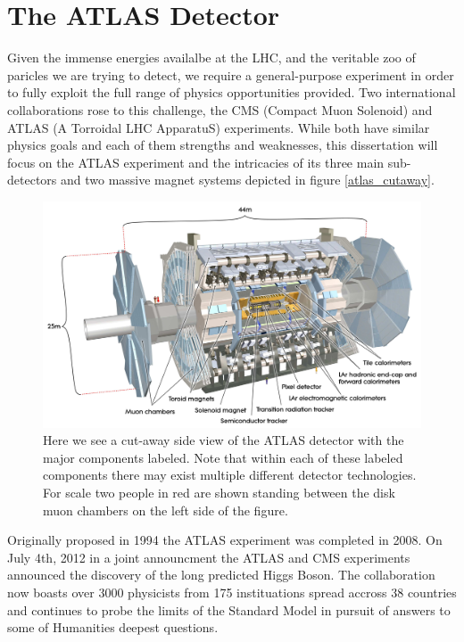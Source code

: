 \chapter{The ATLAS Detector} \label{chap:atlas}

Given the immense energies availalbe at the LHC, and the veritable zoo of
paricles we are trying to detect, we require a general-purpose experiment in
order to fully exploit the full range of physics opportunities provided.  Two
international collaborations rose to this challenge, the CMS (Compact Muon
Solenoid) and ATLAS (A Torroidal LHC ApparatuS) experiments.  While both have
similar physics goals and each of them strengths and weaknesses, this
dissertation will focus on the ATLAS experiment and the intricacies of its three
main sub-detectors and two massive magnet systems depicted in figure
\ref{atlas_cutaway}.

\begin{figure}[!htbp]
  \begin{center}
    \includegraphics[width=0.9\linewidth]{figures/atlas/atlas_cutaway}
    \caption{ \cite{PERF-2007-01} Here we see a cut-away side view of the ATLAS
detector with the major components labeled.  Note that within each of these
labeled components there may exist multiple different detector technologies.
For scale two people in red are shown standing between the disk muon chambers on the
left side of the figure. }
    \label{fig:atlas_cutaway}
  \end{center}
\end{figure}

Originally proposed in 1994 the ATLAS experiment was completed in 2008. On
July 4th, 2012 in a joint announcment the ATLAS and CMS experiments announced
the discovery of the long predicted Higgs Boson.  The collaboration now boasts
over 3000 physicists from 175 instituations spread accross 38 countries and
continues to probe the limits of the Standard Model in pursuit of answers to
some of Humanities deepest questions.

